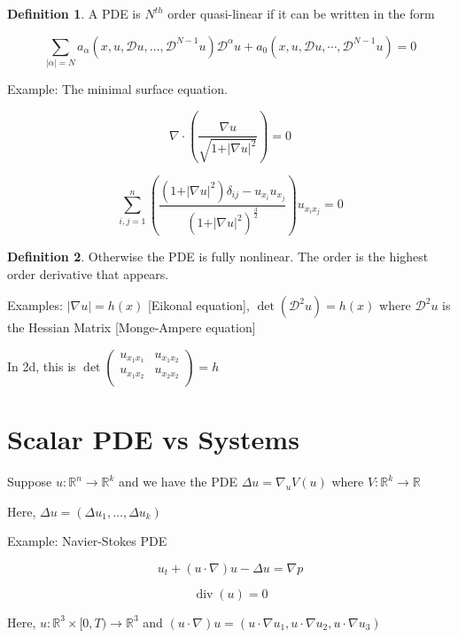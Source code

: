 \documentclass{article}
\theoremstyle{definition}
\newtheorem{definition}{Definition}
\begin{document}
\begin{definition}
    A PDE is \(N^{th} \) order quasi-linear if it can be written in the form

    \[
        \sum_{\vert \alpha  \vert = N } a_\alpha (x,u,\mathcal{D} u, \dots , \mathcal{D} ^{N-1}u) \mathcal{D} ^\alpha u + a_0(x,u,\mathcal{D} u,\cdots,\mathcal{D} ^{N-1}u) = 0
    \]
\end{definition}

Example: The minimal surface equation.

\[
    \nabla \cdot \left( \frac{\nabla u}{\sqrt{1+\vert \nabla u \vert ^2} } \right) =0
\]

\[
    \sum_{i,j=1}^{n} \left( \frac{(1+\vert \nabla u \vert ^2) \delta_{ij} - u_{x_i}u_{x_j}}{(1+\vert \nabla u \vert ^2)^{\frac{3}{2}}} \right) u_{x_i x_j} = 0   
\]

\begin{definition}
    Otherwise the PDE is fully nonlinear. The order is the highest order derivative that appears.
\end{definition}

Examples: \(\vert \nabla u \vert = h(x)\) [Eikonal equation], \(\det(\mathcal{D} ^2 u) = h(x)\) where \(\mathcal{D} ^2 u\) is the Hessian Matrix [Monge-Ampere equation]

In 2d, this is \(\det \begin{pmatrix}
    u_{x_1 x_1} &  u_{x_1 x_2} \\
    u_{x_1 x_2} &  u_{x_2 x_2} \\
\end{pmatrix} = h\) 

\section*{Scalar PDE vs Systems}

Suppose \(u:\mathbb{R} ^n \to \mathbb{R} ^k\) and we have the PDE \(\Delta u = \nabla_u V(u)\) where \(V:\mathbb{R} ^k \to \mathbb{R} \) 

Here, \(\Delta u = (\Delta u_1, \dots ,\Delta u_k)\) 

Example: Navier-Stokes PDE

\[
    u_{t} +(u\cdot \nabla)u - \Delta u = \nabla p
\]

\[
    \operatorname{div}(u) = 0
\]

Here, \(u:\mathbb{R} ^3 \times [0,T)\to \mathbb{R} ^3\) and \((u\cdot\nabla)u = (u\cdot\nabla u_1, u\cdot\nabla u_2, u\cdot\nabla u_3)\) 
\end{document}
